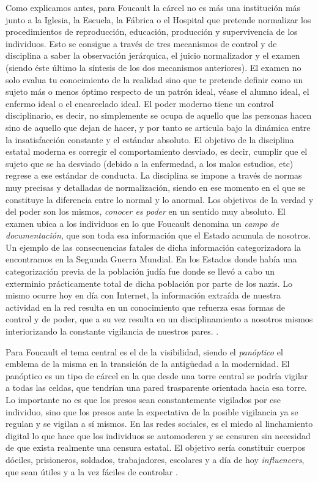 \documentclass[11pt]{article}
\begin{document}
Como explicamos antes, para Foucault la cárcel no es más una institución más junto a la Iglesia, la Escuela, la Fábrica o el Hospital que pretende normalizar los procedimientos de reproducción, educación, producción y supervivencia de los individuos. Esto se consigue a través de tres mecanismos de control y de disciplina a saber la observación jerárquica, el juicio normalizador y el examen (siendo éste último la síntesis de los dos mecanismos anteriores). El examen no solo evalua tu conocimiento de la realidad sino que te pretende definir como un sujeto más o menos óptimo respecto de un patrón ideal, véase el alumno ideal, el enfermo ideal o el encarcelado ideal. El poder moderno tiene un control disciplinario, es decir, no simplemente se ocupa de aquello que las personas hacen sino de aquello que dejan de hacer, y por tanto se articula bajo la dinámica entre la insatisfacción constante y el estándar absoluto. El objetivo de la disciplina estatal moderna es corregir el comportamiento desviado, es decir, cumplir que el sujeto que se ha desviado (debido a la enfermedad, a los malos estudios, etc) regrese a ese estándar de conducta. La disciplina se impone a través de normas muy precisas y detalladas de normalización, siendo en ese momento en el que se constituye la diferencia entre lo normal y lo anormal. Los objetivos de la verdad y del poder son los mismos, \textit{conocer es poder} en un sentido muy absoluto. El examen ubica a los individuos en lo que Foucault denomina un \textit{campo de documentación}, que son toda esa información que el Estado acumula de nosotros. Un ejemplo de las consecuencias fatales de dicha información categorizadora la encontramos en la Segunda Guerra Mundial. En los Estados donde había una categorización previa de la población judía fue donde se llevó a cabo un exterminio prácticamente total de dicha población por parte de los nazis. Lo mismo ocurre hoy en día con Internet, la información extraída de nuestra actividad en la red resulta en un conocimiento que refuerza esas formas de control y de poder, que a su vez resulta en un disciplinamiento a nosotros mismos interiorizando la constante vigilancia de nuestros pares. \cite{ernesto-foucault}.

Para Foucault el tema central es el de la visibilidad, siendo el \textit{panóptico} el emblema de la misma en la transición de la antigüedad a la modernidad. El panóptico es un tipo de cárcel en la que desde una torre central se podría vigilar a todas las celdas, que tendrían una pared trasparente orientada hacia esa torre. Lo importante no es que los presos sean constantemente vigilados por ese individuo, sino que los presos ante la expectativa de la posible vigilancia ya se regulan y se vigilan a sí mismos. En las redes sociales, es el miedo al linchamiento digital lo que hace que los individuos se automoderen y se censuren sin necesidad de que exista realmente una censura estatal. El objetivo sería constituir cuerpos dóciles, prisioneros, soldados, trabajadores, escolares y a día de hoy \textit{influencers}, que sean útiles y a la vez fáciles de controlar \cite{ernesto-foucault}.
\end{document}
